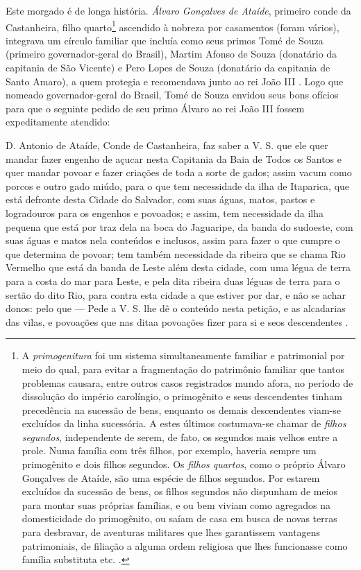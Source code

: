 Este morgado é de longa história. \textit{Álvaro Gonçalves de Ataíde}, primeiro conde da Castanheira, filho quarto\footnote{A \textit{primogenitura} foi um sistema simultaneamente familiar e patrimonial por meio do qual, para evitar a fragmentação do patrimônio familiar que tantos problemas causara, entre outros casos registrados mundo afora, no período de dissolução do império carolíngio, o primogênito e seus descendentes tinham precedência na sucessão de bens, enquanto os demais descendentes viam-se excluídos da linha sucessória. A estes últimos costumava-se chamar de \textit{filhos segundos}, independente de serem, de fato, os segundos mais velhos entre a prole. Numa família com três filhos, por exemplo, haveria sempre um primogênito e dois filhos segundos. Os \textit{filhos quartos}, como o próprio Álvaro Gonçalves de Ataíde, são uma espécie de filhos segundos. Por estarem excluídos da sucessão de bens, os filhos segundos não dispunham de meios para montar suas próprias famílias, e ou bem viviam como agregados na domesticidade do primogênito, ou saíam de casa em busca de novas terras para desbravar, de aventuras militares que lhes garantissem vantagens patrimoniais, de filiação a alguma ordem religiosa que lhes funcionasse como família substituta etc. \cite{BERNARDO1997,coelho_vincular_1980} . } ascendido à nobreza por casamentos (foram vários), integrava um círculo familiar que incluía como seus primos Tomé de Souza (primeiro governador-geral do Brasil), Martim Afonso de Souza (donatário da capitania de São Vicente) e Pero Lopes de Souza (donatário da capitania de Santo Amaro), a quem protegia e recomendava junto ao rei João III \cite[p.~III-3]{teixeira_doacoes_1978}. Logo que nomeado governador-geral do Brasil, Tomé de Souza envidou seus bons ofícios para que o seguinte pedido de seu primo Álvaro ao rei João III fossem expeditamente atendido:

\begin{citacao}
D. Antonio de Ataíde, Conde de Castanheira, faz saber a V. S. que ele quer mandar fazer engenho de açucar nesta Capitania da Baia de Todos os Santos e quer mandar povoar e fazer criações de toda a sorte de gados; assim vacum como porcos e outro gado miúdo, para o que tem necessidade da ilha de Itaparica, que está defronte desta Cidade do Salvador, com suas águas, matos, pastos e logradouros para os engenhos e povoados; e assim, tem necessidade da ilha pequena que está por traz dela na boca do Jaguaripe, da banda do sudoeste, com suas águas e matos nela conteúdos e inclusos, assim para fazer o que cumpre o que determina de povoar; tem também necessidade da ribeira que se chama Rio Vermelho que está da banda de Leste além desta cidade, com uma légua de terra para a costa do mar para Leste, e pela dita ribeira duas léguas de terra para o sertão do dito Rio, para contra esta cidade a que estiver por dar, e não se achar donos: pelo que --- Pede a V. S. lhe dê o conteúdo nesta petição, e as alcadarias das vilas, e povoações que nas ditaa povoações fizer para si e seos descendentes \cite[p.~III-3]{teixeira_doacoes_1978}.
\end{citacao}

